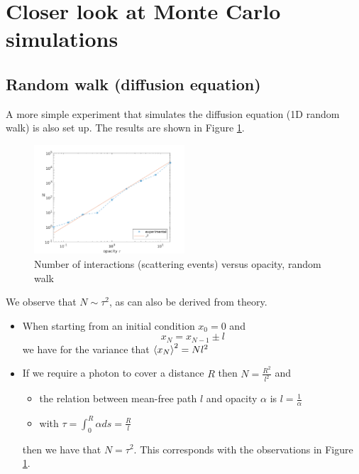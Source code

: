 \documentclass[../main/main.tex]{subfiles}
\begin{document}
\newpage
\section{Closer look at Monte Carlo simulations}
\label{diffusion_Monte_Carlo_mean_free_path}

\subsection{Random walk (diffusion equation)} A more simple experiment that simulates the diffusion equation (1D random walk) is also set up. The results are shown in Figure \ref{random_walk_N_vs_tau}.
	\begin{figure}[!htp]
	\centering
	\includegraphics[width=0.5\textwidth]{../../introductory_exercises/limb_darkening/data/diff_N_vs_opacity.png}
	\caption{Number of interactions (scattering events) versus 	opacity, random walk}
	\label{random_walk_N_vs_tau}
	\end{figure}
We observe that $N \sim \tau^2$, as can also be derived from theory.

\begin{itemize}
\item When starting from an initial condition $x_0 = 0$ and 
\begin{equation}
x_N = x_{N-1} \pm l
\end{equation}
we have for the variance that $\braket{x_N}^2 = N l^2$ 
\item If we require a photon to cover a distance $R$ then $N = \frac{R^2}{l^2}$ and
\begin{itemize}
\item the relation between mean-free path $l$ and opacity $\alpha$ is $l = \frac{1}{\alpha}$
\item with $\tau = \int_0^R \alpha ds = \frac{R}{l}$
\end{itemize}
then we have that $N = \tau^2$. This corresponds with the observations in Figure \ref{random_walk_N_vs_tau}.
\end{itemize}
\end{document}
